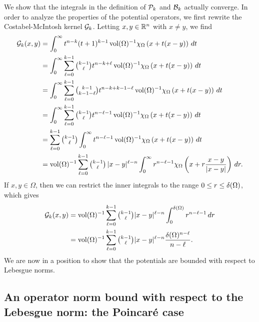 \documentclass[10pt,a4paper]{article}
\newcommand\cye[1]{%
\protect\leavevmode
\begingroup
    \color{blue}%
    #1%
\endgroup
}
\begin{document}
We show that the integrals in the definition of ${\mathcal P}_{k}$ and ${\mathcal B}_{k}$ actually converge. 
In order to analyze the properties of the potential operators,
we first rewrite the Costabel-McIntosh kernel ${\mathcal G}_{k}$.
Letting $x,y \in {\mathbb R}^n$ with $x \neq y$, we find 
\begin{align*}
    {\mathcal G}_{k}(x,y) 
    &= 
    \int_{0}^{\infty} t^{n-k} (t+1)^{k-1} \operatorname{vol}(\Omega)^{-1} \chi_{\Omega} \left( x+t(x-y) \right)\,dt
    \\
    &= 
    \int_{0}^{\infty} \sum_{\ell=0}^{k-1} \tbinom{k-1}{\ell} t^{n-k+\ell} \operatorname{vol}(\Omega)^{-1} \chi_{\Omega} \left( x+t(x-y) \right)\,dt
    \\
    &= 
    \int_{0}^{\infty} \sum_{\ell=0}^{k-1} \tbinom{k-1}{k-1-\ell} t^{n-k+k-1-\ell} \operatorname{vol}(\Omega)^{-1} \chi_{\Omega} \left( x+t(x-y) \right)\,dt
    \\
    &= 
    \int_{0}^{\infty} \sum_{\ell=0}^{k-1} \tbinom{k-1}{\ell} t^{n-\ell-1} \operatorname{vol}(\Omega)^{-1} \chi_{\Omega} \left( x+t(x-y) \right)\,dt
    \\
    &= 
    \sum_{\ell=0}^{k-1} \tbinom{k-1}{\ell} \int_{0}^{\infty} t^{n-\ell-1} \operatorname{vol}(\Omega)^{-1} \chi_{\Omega}\left( x+t(x-y) \right)\,dt 
    \\
    &= 
    \operatorname{vol}(\Omega)^{-1} \sum_{\ell=0}^{k-1} \tbinom{k-1}{\ell} \, |x-y|^{\ell-n} \int_{0}^{\infty} r^{n-\ell-1} \chi_{\Omega}\left(x+r\frac{x-y}{|x-y|}\right)\,dr
    .
\end{align*}
If $x, y \in \Omega$, then we can restrict the inner integrals to the range $0 \leq r \leq {\delta}(\Omega)$, which gives 
\begin{align*}
    {\mathcal G}_{k}(x,y) 
    &= 
    \operatorname{vol}(\Omega)^{-1} \sum_{\ell=0}^{k-1}\tbinom{k-1}{\ell} |x-y|^{\ell-n} \int_{0}^{{\delta}(\Omega)} r^{n-\ell-1} \,dr 
    \\
    &= 
    \operatorname{vol}(\Omega)^{-1} \sum_{\ell=0}^{k-1}\tbinom{k-1}{\ell} |x-y|^{\ell-n} \frac{ {\delta}(\Omega)^{n-\ell} }{n-\ell}.
\end{align*}
We are now in a position to show that the potentials are bounded with respect to Lebesgue norms. 

\subsection{\cye{An operator norm bound with respect to the Lebesgue norm: the Poincar\'e case}}
\end{document}
